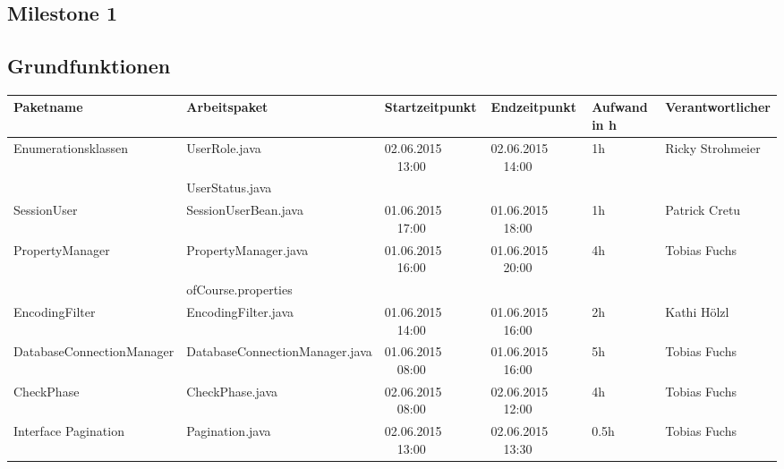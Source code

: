 \begin{landscape}
\section{Milestone 1}

\subsection{Grundfunktionen}
\begin{tabular}{|p{6cm} |p{6cm}|p{3.2cm}|p{3.2cm}|p{2cm}|p{3.5cm}|}
	\hline \textbf{Paketname} & \textbf{Arbeitspaket} & \textbf{Startzeitpunkt} & \textbf{Endzeitpunkt} & \textbf{Aufwand in h} & \textbf{Verantwortlicher} \\ 
	\hline  Enumerationsklassen  & UserRole.java                            & 02.06.2015 \ \ 13:00        & 02.06.2015 \ \  14:00       &  1h                 & Ricky Strohmeier\\ 
	& UserStatus.java                          &                            &                             &                     &\\ 
	\hline  SessionUser          & SessionUserBean.java                     & 01.06.2015 \ \ 17:00        & 01.06.2015 \ \ 18:00        &  1h                 & Patrick Cretu\\ 
	\hline  PropertyManager      & PropertyManager.java                     & 01.06.2015 \ \ 16:00        & 01.06.2015 \ \ 20:00        &  4h                 & Tobias Fuchs\\ 
	& ofCourse.properties                      &                            &                              &                                                  &\\
	\hline  EncodingFilter       & EncodingFilter.java                      & 01.06.2015 \ \ 14:00         & 01.06.2015  \ \  16:00      &  2h                & Kathi Hölzl\\ 
	\hline  DatabaseConnectionManager       &  DatabaseConnectionManager.java & 01.06.2015 \ \ 08:00       & 01.06.2015  \ \  16:00      &  5h                & Tobias Fuchs\\   
	\hline  CheckPhase           & CheckPhase.java                            & 02.06.2015 \ \ 08:00       & 02.06.2015  \ \  12:00      &  4h                & Tobias Fuchs\\
	\hline  Interface Pagination & Pagination.java                            & 02.06.2015 \ \ 13:00       & 02.06.2015  \ \  13:30      &  0.5h              & Tobias Fuchs\\

\end{tabular}
\end{landscape}
